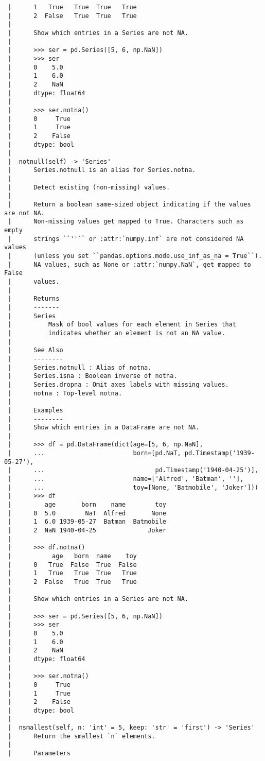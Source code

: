 \documentclass[
  letterpaper,
  DIV=11,
  numbers=noendperiod]{scrreprt}
\begin{document}
\begin{verbatim}
 |      1   True   True  True   True
 |      2  False   True  True   True
 |      
 |      Show which entries in a Series are not NA.
 |      
 |      >>> ser = pd.Series([5, 6, np.NaN])
 |      >>> ser
 |      0    5.0
 |      1    6.0
 |      2    NaN
 |      dtype: float64
 |      
 |      >>> ser.notna()
 |      0     True
 |      1     True
 |      2    False
 |      dtype: bool
 |  
 |  notnull(self) -> 'Series'
 |      Series.notnull is an alias for Series.notna.
 |      
 |      Detect existing (non-missing) values.
 |      
 |      Return a boolean same-sized object indicating if the values are not NA.
 |      Non-missing values get mapped to True. Characters such as empty
 |      strings ``''`` or :attr:`numpy.inf` are not considered NA values
 |      (unless you set ``pandas.options.mode.use_inf_as_na = True``).
 |      NA values, such as None or :attr:`numpy.NaN`, get mapped to False
 |      values.
 |      
 |      Returns
 |      -------
 |      Series
 |          Mask of bool values for each element in Series that
 |          indicates whether an element is not an NA value.
 |      
 |      See Also
 |      --------
 |      Series.notnull : Alias of notna.
 |      Series.isna : Boolean inverse of notna.
 |      Series.dropna : Omit axes labels with missing values.
 |      notna : Top-level notna.
 |      
 |      Examples
 |      --------
 |      Show which entries in a DataFrame are not NA.
 |      
 |      >>> df = pd.DataFrame(dict(age=[5, 6, np.NaN],
 |      ...                        born=[pd.NaT, pd.Timestamp('1939-05-27'),
 |      ...                              pd.Timestamp('1940-04-25')],
 |      ...                        name=['Alfred', 'Batman', ''],
 |      ...                        toy=[None, 'Batmobile', 'Joker']))
 |      >>> df
 |         age       born    name        toy
 |      0  5.0        NaT  Alfred       None
 |      1  6.0 1939-05-27  Batman  Batmobile
 |      2  NaN 1940-04-25              Joker
 |      
 |      >>> df.notna()
 |           age   born  name    toy
 |      0   True  False  True  False
 |      1   True   True  True   True
 |      2  False   True  True   True
 |      
 |      Show which entries in a Series are not NA.
 |      
 |      >>> ser = pd.Series([5, 6, np.NaN])
 |      >>> ser
 |      0    5.0
 |      1    6.0
 |      2    NaN
 |      dtype: float64
 |      
 |      >>> ser.notna()
 |      0     True
 |      1     True
 |      2    False
 |      dtype: bool
 |  
 |  nsmallest(self, n: 'int' = 5, keep: 'str' = 'first') -> 'Series'
 |      Return the smallest `n` elements.
 |      
 |      Parameters

\end{verbatim}
\end{document}
